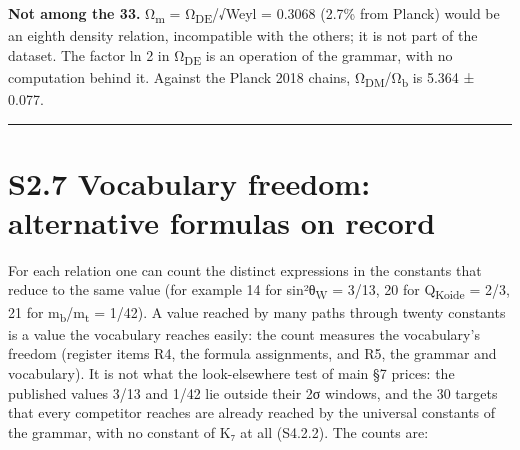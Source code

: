 \documentclass[11pt,a4paper]{article}
\begin{document}
\textbf{Not among the 33.} Ω\textsubscript{m} = Ω\textsubscript{DE}/√Weyl = 0.3068 (2.7\% from Planck) would be an eighth density relation, incompatible with the others; it is not part of the dataset. The factor ln 2 in Ω\textsubscript{DE} is an operation of the grammar, with no computation behind it. Against the Planck 2018 chains, Ω\textsubscript{DM}/Ω\textsubscript{b} is 5.364 ± 0.077.

\begin{center}\rule{\linewidth}{0.5pt}\end{center}

\section{S2.7 Vocabulary freedom: alternative formulas on record}\label{s2.7-vocabulary-freedom-alternative-formulas-on-record}

For each relation one can count the distinct expressions in the constants that reduce to the same value (for example 14 for sin²θ\textsubscript{W} = 3/13, 20 for Q\textsubscript{Koide} = 2/3, 21 for m\textsubscript{b}/m\textsubscript{t} = 1/42). A value reached by many paths through twenty constants is a value the vocabulary reaches easily: the count measures the vocabulary's freedom (register items R4, the formula assignments, and R5, the grammar and vocabulary). It is not what the look-elsewhere test of main §7 prices: the published values 3/13 and 1/42 lie outside their 2σ windows, and the 30 targets that every competitor reaches are already reached by the universal constants of the grammar, with no constant of K₇ at all (S4.2.2). The counts are:
\end{document}
